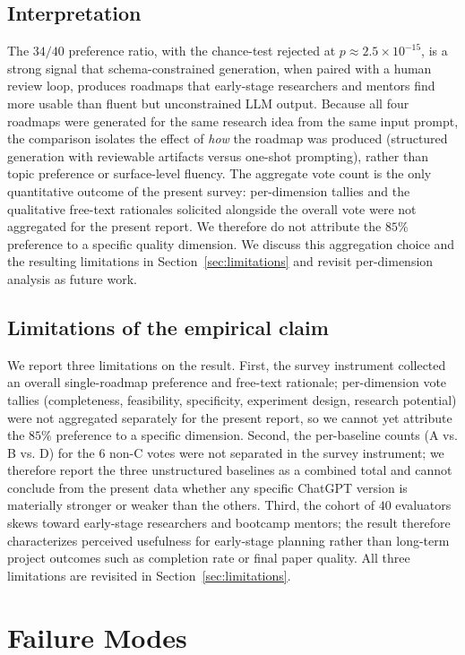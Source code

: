 \documentclass[11pt]{article}
\begin{document}
\subsection*{Interpretation}
The $34/40$ preference ratio, with the chance-test rejected at $p \approx 2.5 \times 10^{-15}$, is a strong signal that schema-constrained generation, when paired with a human review loop, produces roadmaps that early-stage researchers and mentors find more usable than fluent but unconstrained LLM output. Because all four roadmaps were generated for the same research idea from the same input prompt, the comparison isolates the effect of \emph{how} the roadmap was produced (structured generation with reviewable artifacts versus one-shot prompting), rather than topic preference or surface-level fluency. The aggregate vote count is the only quantitative outcome of the present survey: per-dimension tallies and the qualitative free-text rationales solicited alongside the overall vote were not aggregated for the present report. We therefore do not attribute the $85\%$ preference to a specific quality dimension. We discuss this aggregation choice and the resulting limitations in Section~\ref{sec:limitations} and revisit per-dimension analysis as future work.

\subsection*{Limitations of the empirical claim}
We report three limitations on the result. First, the survey instrument collected an overall single-roadmap preference and free-text rationale; per-dimension vote tallies (completeness, feasibility, specificity, experiment design, research potential) were not aggregated separately for the present report, so we cannot yet attribute the $85\%$ preference to a specific dimension. Second, the per-baseline counts (A vs. B vs. D) for the $6$ non-C votes were not separated in the survey instrument; we therefore report the three unstructured baselines as a combined total and cannot conclude from the present data whether any specific ChatGPT version is materially stronger or weaker than the others. Third, the cohort of $40$ evaluators skews toward early-stage researchers and bootcamp mentors; the result therefore characterizes perceived usefulness for early-stage planning rather than long-term project outcomes such as completion rate or final paper quality. All three limitations are revisited in Section~\ref{sec:limitations}.


\section{Failure Modes}
\label{sec:failure_modes}
\end{document}
